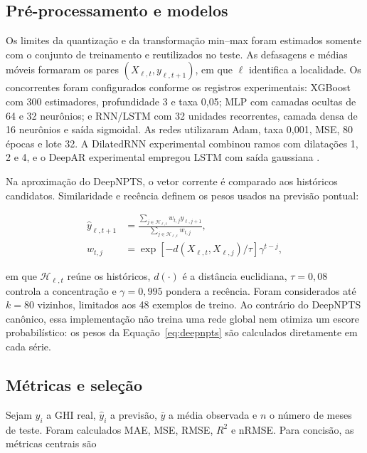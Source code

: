\documentclass[12pt,a4paper]{article}
\begin{document}
\subsection{Pré-processamento e modelos}

Os limites da quantização e da transformação min--max foram estimados somente com o conjunto de treinamento e reutilizados no teste. As defasagens e médias móveis formaram os pares $(X_{\ell,t},y_{\ell,t+1})$, em que $\ell$ identifica a localidade. Os concorrentes foram configurados conforme os registros experimentais: XGBoost com 300 estimadores, profundidade 3 e taxa 0,05; MLP com camadas ocultas de 64 e 32 neurônios; e RNN/LSTM com 32 unidades recorrentes, camada densa de 16 neurônios e saída sigmoidal. As redes utilizaram Adam, taxa 0,001, MSE, 80 épocas e lote 32. A DilatedRNN experimental combinou ramos com dilatações 1, 2 e 4, e o DeepAR experimental empregou LSTM com saída gaussiana \citep{chang2017,salinas2020}.

Na aproximação do DeepNPTS, o vetor corrente é comparado aos históricos candidatos. Similaridade e recência definem os pesos usados na previsão pontual:

\begin{equation}
\begin{aligned}
  \widehat{y}_{\ell,t+1}
  &=\frac{\sum_{j\in\mathcal H_{\ell,t}}w_{t,j}y_{\ell,j+1}}
  {\sum_{j\in\mathcal H_{\ell,t}}w_{t,j}},\\
  w_{t,j}&=\exp\!\left[-d(X_{\ell,t},X_{\ell,j})/\tau\right]\gamma^{t-j},
\end{aligned}
\label{eq:deepnpts}
\end{equation}

\noindent em que $\mathcal H_{\ell,t}$ reúne os históricos, $d(\cdot)$ é a distância euclidiana, $\tau=0{,}08$ controla a concentração e $\gamma=0{,}995$ pondera a recência. Foram considerados até $k=80$ vizinhos, limitados aos 48 exemplos de treino. Ao contrário do DeepNPTS canônico, essa implementação não treina uma rede global nem otimiza um escore probabilístico: os pesos da Equação~\ref{eq:deepnpts} são calculados diretamente em cada série.

\subsection{Métricas e seleção}

Sejam $y_i$ a GHI real, $\widehat y_i$ a previsão, $\bar y$ a média observada e $n$ o número de meses de teste. Foram calculados MAE, MSE, RMSE, $R^2$ e nRMSE. Para concisão, as métricas centrais são
\end{document}

